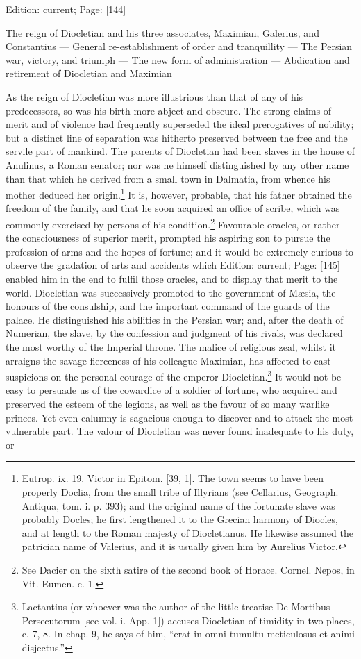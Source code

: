 Edition: current; Page: [144]


The reign of Diocletian and his three associates, Maximian, Galerius, and Constantius \texthebrew{—} General re-establishment of order and tranquillity \texthebrew{—} The Persian war, victory, and triumph \texthebrew{—} The new form of administration \texthebrew{—} Abdication and retirement of Diocletian and Maximian

As the reign of Diocletian was more illustrious than that of any of his predecessors, so was his birth more abject and obscure. The strong claims of merit and of violence had frequently superseded the ideal prerogatives of nobility; but a distinct line of separation was hitherto preserved between the free and the servile part of mankind. The parents of Diocletian had been slaves in the house of Anulinus, a Roman senator; nor was he himself distinguished by any other name than that which he derived from a small town in Dalmatia, from whence his mother deduced her origin.\footnote{Eutrop. ix. 19. Victor in Epitom. [39, 1]. The town seems to have been properly Doclia, from the small tribe of Illyrians (see Cellarius, Geograph. Antiqua, tom. i. p. 393); and the original name of the fortunate slave was probably Docles; he first lengthened it to the Grecian harmony of Diocles, and at length to the Roman majesty of Diocletianus. He likewise assumed the patrician name of Valerius, and it is usually given him by Aurelius Victor.} It is, however, probable, that his father obtained the freedom of the family, and that he soon acquired an office of scribe, which was commonly exercised by persons of his condition.\footnote{See Dacier on the sixth satire of the second book of Horace. Cornel. Nepos, in Vit. Eumen. c. 1.} Favourable oracles, or rather the consciousness of superior merit, prompted his aspiring son to pursue the profession of arms and the hopes of fortune; and it would be extremely curious to observe the gradation of arts and accidents which Edition: current; Page: [145] enabled him in the end to fulfil those oracles, and to display that merit to the world. Diocletian was successively promoted to the government of Mæsia, the honours of the consulship, and the important command of the guards of the palace. He distinguished his abilities in the Persian war; and, after the death of Numerian, the slave, by the confession and judgment of his rivals, was declared the most worthy of the Imperial throne. The malice of religious zeal, whilst it arraigns the savage fierceness of his colleague Maximian, has affected to cast suspicions on the personal courage of the emperor Diocletian.\footnote{Lactantius (or whoever was the author of the little treatise De Mortibus Persecutorum [see vol. i. App. 1]) accuses Diocletian of timidity in two places, c. 7, 8. In chap. 9, he says of him, \texthebrew{“}erat in omni tumultu meticulosus et animi disjectus.\texthebrew{}”} It would not be easy to persuade us of the cowardice of a soldier of fortune, who acquired and preserved the esteem of the legions, as well as the favour of so many warlike princes. Yet even calumny is sagacious enough to discover and to attack the most vulnerable part. The valour of Diocletian was never found inadequate to his duty, or 